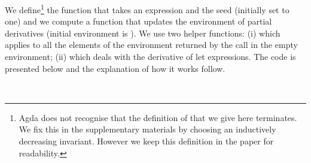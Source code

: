 We define\footnote{Agda does not recognise that the definition of  that
we give here terminates.  We fix this in the supplementary materials by choosing
an inductively decreasing invariant.  However we keep this definition in the
paper for readability.} the function  that takes an expression 
and the seed (initially set to one) and we compute a function that
updates the environment of partial derivatives (initial environment is ).
We use two helper functions: (i)  which applies  to all
the elements of the environment returned by the  call in the empty environment;
(ii)  which deals with the derivative of let expressions.  The code is presented
below and the explanation of how it works follow.
\begin{code}[hide]%
%
\>[2]\AgdaSymbol{\{-\#}\AgdaSpace{}%
\AgdaSpace{}%
\AgdaSymbol{\#-\}}%
\>[23]\<%
\\
%
\>[23]\<%
\end{code}
